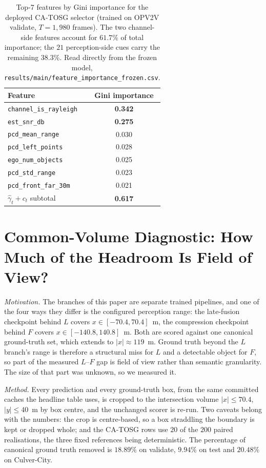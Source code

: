 \documentclass[journal]{IEEEtran}
\newcommand{\method}{CA-TOSG}
\begin{document}
\begin{table}[t]
\centering
\footnotesize
\setlength{\tabcolsep}{3pt}
\caption{Top-7 features by Gini importance for the deployed \method{} selector (trained on OPV2V validate, $T=1{,}980$ frames). The two channel-side features account for $61.7\%$ of total importance; the $21$ perception-side cues carry the remaining $38.3\%$. Read directly from the frozen model, \texttt{results/main/feature\_importance\_frozen.csv}.}
\label{tab:feat_imp}
\begin{tabular}{lc}
\toprule
Feature & Gini importance \\
\midrule
\texttt{channel\_is\_rayleigh}    & \textbf{0.342} \\
\texttt{est\_snr\_db}             & \textbf{0.275} \\
\texttt{pcd\_mean\_range}         & 0.030 \\
\texttt{pcd\_left\_points}        & 0.028 \\
\texttt{ego\_num\_objects}        & 0.025 \\
\texttt{pcd\_std\_range}          & 0.023 \\
\texttt{pcd\_front\_far\_30m}     & 0.021 \\
\midrule
$\hat\gamma_t + c_t$ subtotal     & \textbf{0.617} \\
\bottomrule
\end{tabular}
\end{table}



\section{Common-Volume Diagnostic: How Much of the Headroom Is Field of View?}\label{sec:common_volume}

\emph{Motivation.} The branches of this paper are separate trained pipelines, and one of the four
ways they differ is the configured perception range: the late-fusion checkpoint behind $L$ covers
$x \in [-70.4, 70.4]$~m, the compression checkpoint behind $F$ covers $x \in [-140.8, 140.8]$~m.
Both are scored against one canonical ground-truth set, which extends to $|x| \approx 119$~m. Ground
truth beyond the $L$ branch's range is therefore a structural miss for $L$ and a detectable object
for $F$, so part of the measured $L$--$F$ gap is field of view rather than semantic granularity. The
size of that part was unknown, so we measured it.

\emph{Method.} Every prediction and every ground-truth box, from the same committed caches the
headline table uses, is cropped to the intersection volume $|x| \le 70.4$, $|y| \le 40$~m by box
centre, and the unchanged scorer is re-run. Two caveats belong with the numbers: the crop is
centre-based, so a box straddling the boundary is kept or dropped whole; and the \method{} rows use
$20$ of the $200$ paired realisations, the three fixed references being deterministic. The
percentage of canonical ground truth removed is $18.89\%$ on validate, $9.94\%$ on test and
$20.48\%$ on Culver-City.
\end{document}

